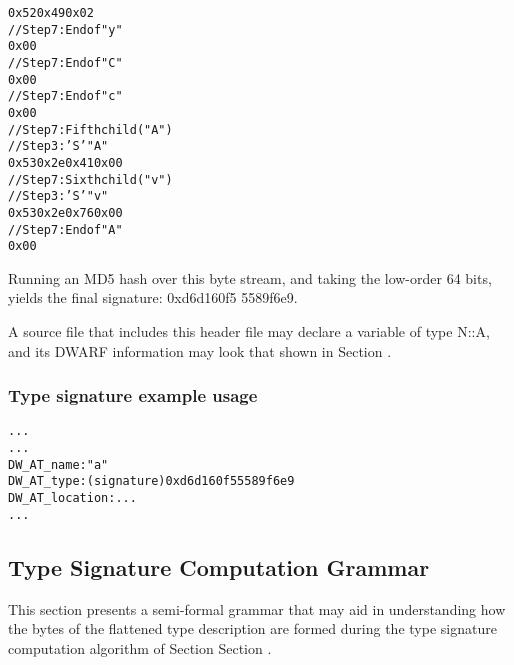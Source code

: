 \begin{alltt}
            0x52 0x49 0x02
            // Step 7: End of  "y"
            0x00
        // Step 7: End of  "C"
        0x00
    // Step 7: End of  "c"
    0x00
// Step 7: Fifth child ("A")
    // Step 3: 'S'  "A"
    0x53 0x2e 0x41 0x00
// Step 7: Sixth child ("v")
    // Step 3: 'S'  "v"
    0x53 0x2e 0x76 0x00
// Step 7: End of  "A"
0x00
\end{alltt}

Running an MD5 hash over this byte stream, and taking the
low-order 64 bits, yields the final signature: 0xd6d160f5
5589f6e9.


A source file that includes this header file may declare a
variable of type N::A, and its DWARF information may look
that shown in 
Section .


\subsubsection{Type signature example usage}
\label{app:typesignatureexampleusage}

\begin{alltt}
  ...
    ...
      DW\-\_AT\-\_name : "a"
      DW\-\_AT\-\_type : (signature) 0xd6d160f5 5589f6e9
      DW\-\_AT\-\_location : ...
    ...
\end{alltt}

\subsection{Type Signature Computation Grammar}
\label{app:typesignaturecomputationgrammar}

This section
presents a semi-formal grammar that may aid in understanding
how the bytes of the flattened type description are formed
during the type signature computation algorithm of Section
Section . 


